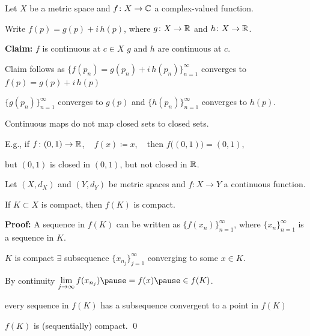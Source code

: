 \documentclass[10pt,aspectratio=149]{beamer}
\begin{document}
\begin{frame}

Let $X$ be a metric space and $f \colon X \to {\mathbb{C}}$ a complex-valued function.

\pause
\medskip

Write $f(p) = g(p) + i \, h(p)$, where $g \colon X \to {\mathbb{R}}$ and $h \colon X \to {\mathbb{R}}$.


\pause
\medskip

\textbf{Claim:}
$f$ is continuous at $c \in X$ \wiffif $g$ and $h$ are continuous at $c$.

\pause
\medskip

Claim follows as $\bigl\{ f(p_n) = g(p_n) + i \,h(p_n) \bigr\}_{n=1}^\infty$
converges to $f(p) = g(p) + i \, h(p)$

\pause
\iffif \quad
$\bigl\{ g(p_n) \bigr\}_{n=1}^\infty$ converges to $g(p)$
\pause
and
$\bigl\{ h(p_n) \bigr\}_{n=1}^\infty$ converges to $h(p)$.

\end{frame}

\begin{frame}

Continuous maps do not map closed sets to closed sets.

\pause
E.g., if $f \colon (0,1) \to {\mathbb{R}}$, ~ $f(x) \coloneqq x$, ~ then
$f\bigl((0,1)\bigr) = (0,1)$,

\pause
but $(0,1)$ is closed in $(0,1)$, but not closed in ${\mathbb{R}}$.

\pause

\begin{lemma}
Let $(X,d_X)$ and $(Y,d_Y)$ be metric spaces
and $f \colon X \to Y$ a continuous function.

\pause
If $K \subset X$ is compact, then $f(K)$ is compact.
\end{lemma}

\pause
\textbf{Proof:}
A sequence in $f(K)$ can be written as
$\bigl\{ f(x_n) \bigr\}_{n=1}^\infty$, where
$\{ x_n \}_{n=1}^\infty$ is a sequence in $K$.

\pause
\medskip

$K$ is compact \wthus $\exists$
subsequence
$\{ x_{n_j} \}_{j=1}^\infty$ converging to some $x \in K$.

\pause
\medskip

By continuity
$\displaystyle
\lim_{j\to\infty} f(x_{n_j})
\pause
= f(x)
\pause
\in f(K)$.

\pause
\medskip

\thus \quad every sequence in $f(K)$ has a subsequence convergent to 
a point in $f(K)$

\pause
\thus \quad $f(K)$ is (sequentially) compact.
\qed

\end{frame}
\end{document}
